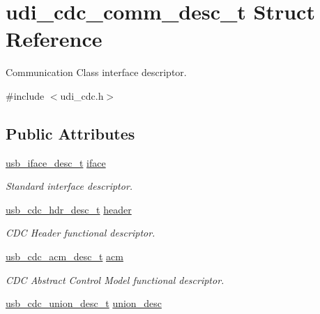 \hypertarget{structudi__cdc__comm__desc__t}{\section{udi\-\_\-cdc\-\_\-comm\-\_\-desc\-\_\-t Struct Reference}
\label{structudi__cdc__comm__desc__t}
}


Communication Class interface descriptor.  




{\ttfamily \#include $<$udi\-\_\-cdc.\-h$>$}

\subsection*{Public Attributes}
\begin{DoxyCompactItemize}
\item 
\hypertarget{structudi__cdc__comm__desc__t_a6dfc36e8b57260fa2e77bea312a164da}{\hyperlink{structusb__iface__desc__t}{usb\-\_\-iface\-\_\-desc\-\_\-t} \hyperlink{structudi__cdc__comm__desc__t_a6dfc36e8b57260fa2e77bea312a164da}{iface}}\label{structudi__cdc__comm__desc__t_a6dfc36e8b57260fa2e77bea312a164da}

\begin{DoxyCompactList}\small\item\em Standard interface descriptor. \end{DoxyCompactList}\item 
\hypertarget{structudi__cdc__comm__desc__t_a398a1894f61cb98fe155d0d9e6318be1}{\hyperlink{structusb__cdc__hdr__desc__t}{usb\-\_\-cdc\-\_\-hdr\-\_\-desc\-\_\-t} \hyperlink{structudi__cdc__comm__desc__t_a398a1894f61cb98fe155d0d9e6318be1}{header}}\label{structudi__cdc__comm__desc__t_a398a1894f61cb98fe155d0d9e6318be1}

\begin{DoxyCompactList}\small\item\em C\-D\-C Header functional descriptor. \end{DoxyCompactList}\item 
\hypertarget{structudi__cdc__comm__desc__t_a6643c3fe52c61dc7cb0cc38a9f324d86}{\hyperlink{structusb__cdc__acm__desc__t}{usb\-\_\-cdc\-\_\-acm\-\_\-desc\-\_\-t} \hyperlink{structudi__cdc__comm__desc__t_a6643c3fe52c61dc7cb0cc38a9f324d86}{acm}}\label{structudi__cdc__comm__desc__t_a6643c3fe52c61dc7cb0cc38a9f324d86}

\begin{DoxyCompactList}\small\item\em C\-D\-C Abstract Control Model functional descriptor. \end{DoxyCompactList}\item 
\hypertarget{structudi__cdc__comm__desc__t_aa23728196c57ec96df6a1372c5696313}{\hyperlink{structusb__cdc__union__desc__t}{usb\-\_\-cdc\-\_\-union\-\_\-desc\-\_\-t} \hyperlink{structudi__cdc__comm__desc__t_aa23728196c57ec96df6a1372c5696313}{union\-\_\-desc}}\label{structudi__cdc__comm__desc__t_aa23728196c57ec96df6a1372c5696313}


\end{DoxyCompactItemize}
